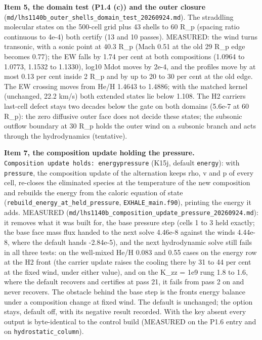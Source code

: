 \documentclass[english,a4paper]{my_memo}
\begin{document}
\textbf{Item 5, the domain test (P1.4 (c)) and the outer closure}
(\texttt{md/lhs1140b\_outer\_shells\_domain\_test\_20260924.md}). The straddling
molecular states on the 500-cell grid plus 43 shells to 60 R\_p (spacing ratio
continuous to 4e-4) both certify (13 and 10 passes). MEASURED: the wind turns
transonic, with a sonic point at 40.3 R\_p (Mach 0.51 at the old 29 R\_p edge
becomes 0.77); the EW falls by 1.74 per cent at both compositions (1.0964 to
1.0773, 1.1532 to 1.1330), log10 Mdot moves by 2e-4, and the profiles move by
at most 0.13 per cent inside 2 R\_p and by up to 20 to 30 per cent at the old
edge. The EW crossing moves from He/H 1.4643 to 1.4886; with the matched
kernel (unchanged, 22.2 km/s) both extended states lie below 1.108. The H2
carrier\textquotesingle s last-cell defect stays two decades below the gate on both domains
(5.6e-7 at 60 R\_p): the zero diffusive outer face does not decide these
states; the subsonic outflow boundary at 30 R\_p holds the outer wind on a
subsonic branch and acts through the hydrodynamics (tentative).

\textbf{Item 7, the composition update holding the pressure.} \texttt{Composition\ update\ holds:\ energy\textbar{}pressure} (K15j, default \texttt{energy}): with \texttt{pressure}, the
composition update of the alternation keeps rho, v and p of every cell,
re-closes the eliminated species at the temperature of the new composition
and rebuilds the energy from the caloric equation of state
(\texttt{rebuild\_energy\_at\_held\_pressure}, \texttt{EXHALE\_main.f90}), printing the energy
it adds. MEASURED (\texttt{md/lhs1140b\_composition\_update\_pressure\_20260924.md}):
it removes what it was built for, the base pressure step (cells 1 to 3 held
exactly; the base face mass flux handed to the next solve 4.46e-8 against the
wind\textquotesingle s 4.44e-8, where the default hands -2.84e-5), and the next hydrodynamic
solve still fails in all three tests: on the well-mixed He/H 0.083 and 0.55
cases on the energy row at the H2 front (the carrier update raises the
cooling there by 31 to 44 per cent at the fixed wind, under either value),
and on the K\_zz = 1e9 rung 1.8 to 1.6, where the default recovers and
certifies at pass 21, it fails from pass 2 on and never recovers. The
obstacle behind the base step is the front\textquotesingle s energy balance under a
composition change at fixed wind. The default is unchanged; the option stays,
default off, with its negative result recorded. With the key absent every
output is byte-identical to the control build (MEASURED on the P1.6 entry and
on \texttt{hydrostatic\_column}).
\end{document}
